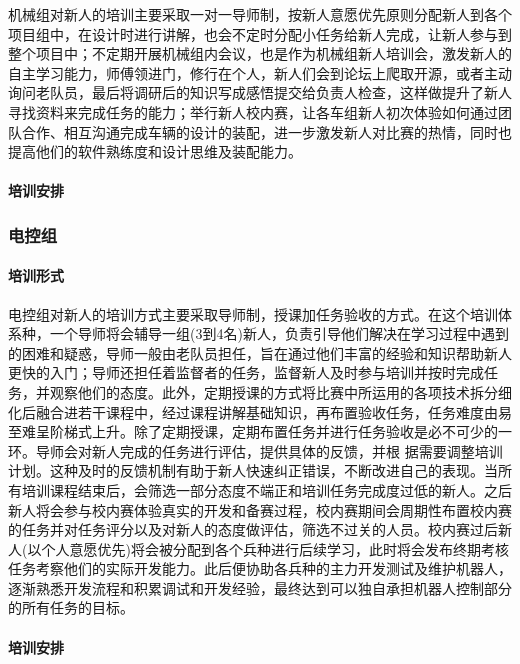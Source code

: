                 机械组对新人的培训主要采取一对一导师制，按新人意愿优先原则分配新人到各个项目组中，在设计时进行讲解，也会不定时分配小任务给新人完成，让新人参与到整个项目中；不定期开展机械组内会议，也是作为机械组新人培训会，激发新人的自主学习能力，师傅领进门，修行在个人，新人们会到论坛上爬取开源，或者主动询问老队员，最后将调研后的知识写成感悟提交给负责人检查，这样做提升了新人寻找资料来完成任务的能力；举行新人校内赛，让各车组新人初次体验如何通过团队合作、相互沟通完成车辆的设计的装配，进一步激发新人对比赛的热情，同时也提高他们的软件熟练度和设计思维及装配能力。
  
            \paragraph{培训安排}


        \subsubsection{电控组}

            \paragraph{培训形式}

                电控组对新人的培训方式主要采取导师制，授课加任务验收的方式。在这个培训体系种，一个导师将会辅导一组(3到4名)新人，负责引导他们解决在学习过程中遇到的困难和疑惑，导师一般由老队员担任，旨在通过他们丰富的经验和知识帮助新人更快的入门；导师还担任着监督者的任务，监督新人及时参与培训并按时完成任务，并观察他们的态度。此外，定期授课的方式将比赛中所运用的各项技术拆分细化后融合进若干课程中，经过课程讲解基础知识，再布置验收任务，任务难度由易至难呈阶梯式上升。除了定期授课，定期布置任务并进行任务验收是必不可少的一环。导师会对新人完成的任务进行评估，提供具体的反馈，并根 据需要调整培训计划。这种及时的反馈机制有助于新人快速纠正错误，不断改进自己的表现。当所有培训课程结束后，会筛选一部分态度不端正和培训任务完成度过低的新人。之后新人将会参与校内赛体验真实的开发和备赛过程，校内赛期间会周期性布置校内赛的任务并对任务评分以及对新人的态度做评估，筛选不过关的人员。校内赛过后新人(以个人意愿优先)将会被分配到各个兵种进行后续学习，此时将会发布终期考核任务考察他们的实际开发能力。此后便协助各兵种的主力开发测试及维护机器人，逐渐熟悉开发流程和积累调试和开发经验，最终达到可以独自承担机器人控制部分的所有任务的目标。

            \paragraph{培训安排}

